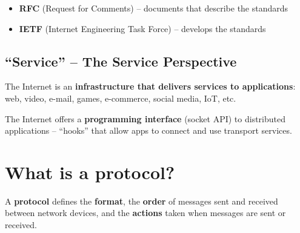 \begin{imagebox}
\end{imagebox}

\begin{keybox}
\begin{itemize}[noitemsep]
    \item \textbf{RFC} (Request for Comments) -- documents that describe the standards
    \item \textbf{IETF} (Internet Engineering Task Force) -- develops the standards
\end{itemize}
\end{keybox}

\subsection{``Service'' -- The Service Perspective}

The Internet is an \textbf{infrastructure that delivers services to applications}: web, video, e-mail, games, e-commerce, social media, IoT, etc.

The Internet offers a \textbf{programming interface} (socket API) to distributed applications -- ``hooks'' that allow apps to connect and use transport services.

\section{What is a protocol?}

\begin{keybox}
A \textbf{protocol} defines the \textbf{format}, the \textbf{order} of messages sent and received between network devices, and the \textbf{actions} taken when messages are sent or received.
\end{keybox}


